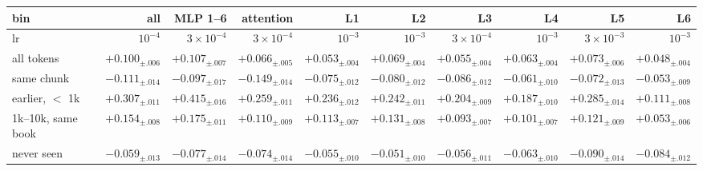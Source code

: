 \begin{tabular}{lrrrrrrrrr}
\toprule
bin & all & MLP 1--6 & attention & L1 & L2 & L3 & L4 & L5 & L6 \\
\midrule
lr & $10^{-4}$ & $3\!\times\!10^{-4}$ & $3\!\times\!10^{-4}$ & $10^{-3}$ & $10^{-3}$ & $3\!\times\!10^{-4}$ & $10^{-3}$ & $3\!\times\!10^{-3}$ & $10^{-3}$ \\
all tokens & $+0.100_{\pm .006}$ & $+0.107_{\pm .007}$ & $+0.066_{\pm .005}$ & $+0.053_{\pm .004}$ & $+0.069_{\pm .004}$ & $+0.055_{\pm .004}$ & $+0.063_{\pm .004}$ & $+0.073_{\pm .006}$ & $+0.048_{\pm .004}$ \\
same chunk & $-0.111_{\pm .014}$ & $-0.097_{\pm .017}$ & $-0.149_{\pm .014}$ & $-0.075_{\pm .012}$ & $-0.080_{\pm .012}$ & $-0.086_{\pm .012}$ & $-0.061_{\pm .010}$ & $-0.072_{\pm .013}$ & $-0.053_{\pm .009}$ \\
earlier, $<$ 1k & $+0.307_{\pm .011}$ & $+0.415_{\pm .016}$ & $+0.259_{\pm .011}$ & $+0.236_{\pm .012}$ & $+0.242_{\pm .011}$ & $+0.204_{\pm .009}$ & $+0.187_{\pm .010}$ & $+0.285_{\pm .014}$ & $+0.111_{\pm .008}$ \\
1k--10k, same book & $+0.154_{\pm .008}$ & $+0.175_{\pm .011}$ & $+0.110_{\pm .009}$ & $+0.113_{\pm .007}$ & $+0.131_{\pm .008}$ & $+0.093_{\pm .007}$ & $+0.101_{\pm .007}$ & $+0.121_{\pm .009}$ & $+0.053_{\pm .006}$ \\
never seen & $-0.059_{\pm .013}$ & $-0.077_{\pm .014}$ & $-0.074_{\pm .014}$ & $-0.055_{\pm .010}$ & $-0.051_{\pm .010}$ & $-0.056_{\pm .011}$ & $-0.063_{\pm .010}$ & $-0.090_{\pm .014}$ & $-0.084_{\pm .012}$ \\
\bottomrule
\end{tabular}
